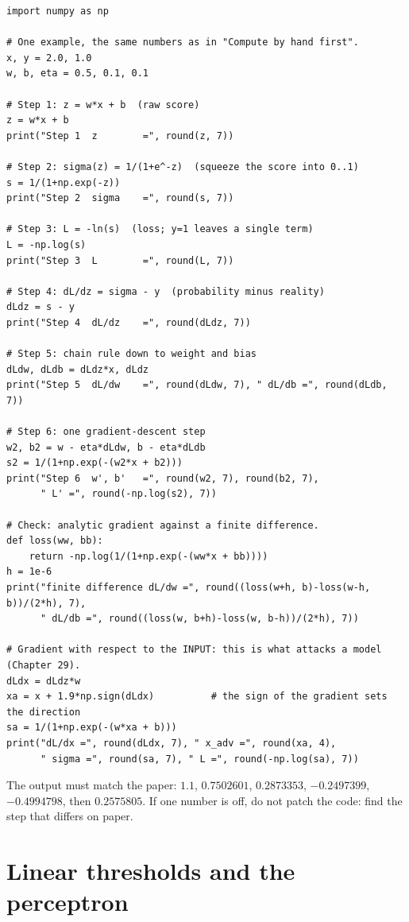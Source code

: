 \begin{lab}
\begin{verbatim}
import numpy as np

# One example, the same numbers as in "Compute by hand first".
x, y = 2.0, 1.0
w, b, eta = 0.5, 0.1, 0.1

# Step 1: z = w*x + b  (raw score)
z = w*x + b
print("Step 1  z        =", round(z, 7))

# Step 2: sigma(z) = 1/(1+e^-z)  (squeeze the score into 0..1)
s = 1/(1+np.exp(-z))
print("Step 2  sigma    =", round(s, 7))

# Step 3: L = -ln(s)  (loss; y=1 leaves a single term)
L = -np.log(s)
print("Step 3  L        =", round(L, 7))

# Step 4: dL/dz = sigma - y  (probability minus reality)
dLdz = s - y
print("Step 4  dL/dz    =", round(dLdz, 7))

# Step 5: chain rule down to weight and bias
dLdw, dLdb = dLdz*x, dLdz
print("Step 5  dL/dw    =", round(dLdw, 7), " dL/db =", round(dLdb, 7))

# Step 6: one gradient-descent step
w2, b2 = w - eta*dLdw, b - eta*dLdb
s2 = 1/(1+np.exp(-(w2*x + b2)))
print("Step 6  w', b'   =", round(w2, 7), round(b2, 7),
      " L' =", round(-np.log(s2), 7))

# Check: analytic gradient against a finite difference.
def loss(ww, bb):
    return -np.log(1/(1+np.exp(-(ww*x + bb))))
h = 1e-6
print("finite difference dL/dw =", round((loss(w+h, b)-loss(w-h, b))/(2*h), 7),
      " dL/db =", round((loss(w, b+h)-loss(w, b-h))/(2*h), 7))

# Gradient with respect to the INPUT: this is what attacks a model (Chapter 29).
dLdx = dLdz*w
xa = x + 1.9*np.sign(dLdx)          # the sign of the gradient sets the direction
sa = 1/(1+np.exp(-(w*xa + b)))
print("dL/dx =", round(dLdx, 7), " x_adv =", round(xa, 4),
      " sigma =", round(sa, 7), " L =", round(-np.log(sa), 7))
\end{verbatim}

The output must match the paper: $1.1$, $0.7502601$, $0.2873353$, $-0.2497399$,
$-0.4994798$, then $0.2575805$. If one number is off, do not patch the code: find the step
that differs on paper.
\end{lab}

\section{Linear thresholds and the perceptron}

